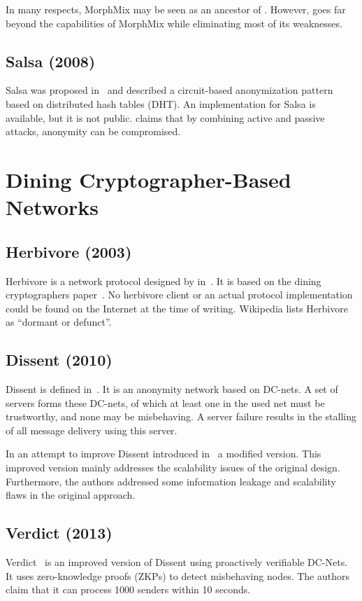 In many respects, MorphMix may be seen as an ancestor of \MessageVortex. However, \MessageVortex{} goes far beyond the capabilities of MorphMix while eliminating most of its weaknesses.


\subsection{Salsa (2008)}
Salsa was proposed in~\cite{Salsa} and described a circuit-based anonymization pattern based on distributed hash tables (DHT). An implementation for Salsa is available, but it is not public. \cite{ccs2008:mittal} claims that by combining active and passive attacks, anonymity can be compromised.

\section{Dining Cryptographer-Based Networks}
\subsection{Herbivore (2003)}
Herbivore is a network protocol designed by \citeauthor{herbivore:tr} in~\cite{herbivore:tr}. It is based on the dining cryptographers paper~\cite{chaum-dc}. No herbivore client or an actual protocol implementation could be found on the Internet at the time of writing. Wikipedia lists Herbivore as ``dormant or defunct''.

\subsection{Dissent (2010)}
Dissent is defined in~\cite{Corrigan-Gibbs:2010:DAA:1866307.1866346}. It is an anonymity network based on DC-nets. A set of servers forms these DC-nets, of which at least one in the used net must be trustworthy, and none may be misbehaving. A server failure results in the stalling of all message delivery using this server.

In an attempt to improve Dissent \citeauthor{wolinsky2012dissent} introduced in~\cite{wolinsky2012dissent} a modified version. This improved version mainly addresses the scalability issues of the original design. Furthermore, the authors addressed some information leakage and scalability flaws in the original approach.

\subsection{Verdict (2013)}
Verdict~\cite{180367} is an improved version of Dissent using proactively verifiable DC-Nets. It uses zero-knowledge proofs (ZKPs) to detect misbehaving nodes. The authors claim that it can process 1000 senders within 10 seconds.

